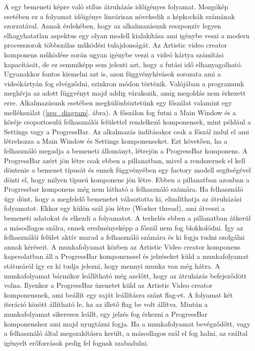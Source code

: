 \documentclass[12pt, a4paper, oneside]{book}
\theoremstyle{tetel}
\begin{document}
A egy bemeneti képre való stílus átruházás időigényes folyamat. Mozgókép esetében ez a folyamat időigénye lineárisan növekedik a képkockák számának szorzatával. Annak érdekében, hogy az alkalmazásunk reszponzív legyen elhagyhatatlan aspektus egy olyan modell kialakítása ami igénybe veszi a modern processzorok többszálas működési tulajdonságát. Az Artistic video creator komponens működése során ugyan igénybe veszi a videó kártya számítási kapacítását, de ez semmiképp sem jelenti azt, hogy a futási idő elhanyagolható. Ugyanakkor fontos kiemelni azt is, azon függvényhívások sorozata ami a videókártyán fog elvégződni, szinkron módon történik. Valójában a programunk meghívja az adott függvényt majd addig várakozik, amig megoldás nem érkezett erre.
\newline
\indent
Alkalmazásunk esetében megkülönböztetünk egy főszálat valamint egy mellékszálat (\ref{seq_diagram}. ábra). A főszálon fog futni a Main Window és a köréje csoportosulú felhasználói felülettel rendelkező komponensek, mint például a Settings vagy a ProgressBar. Az alkalmazás indításakor csak a főszál indul el ami létrehozza a Main Window és Settings komponenseket. Ezt követően, ha a felhasználó megadja a bemeneti állományt, létrejön a ProgressBar komponens. A ProgressBar azért jön létre csak ebben a pillanatban, mivel a rendszernek el kell döntenie a bemenet típusát és ennek függvényében egy factory modell segítségével dönti el, hogy milyen típusú komponens jön létre. Ebben a pillanatban azonban a Progressbar komponens még nem látható a felhasználó számára.
\newline
\indent
Ha felhasználó úgy dönt, hogy a megfelelő bemenetet választotta ki, elindíthatja az átruházási folyamatot. Ekkor egy külön szál jön létre (Worker thread), ami átveszi a bemeneti adatokat és elkezdi a folyamatot. A terhelés ebben a pillanatban átkerül a másodlagos szálra, ennek eredményeképp a főszál nem fog blokkolódni. Így az felhasználói felület aktív marad a felhasználó számára és ki fogja tudni szolgálni annak kéréseit.
A munkafolyamat közben az Artistic Video creator komponens kapcsolatban áll a ProgressBar komponenssel és jelzéseket küld a munkafolyamat státusáról így ez ki tudja jelezni, hogy mennyi munka van még hátra. A munkafolyamat bármikor leállítható még azelőtt, hogy az átruházás befejeződött volna. Ilyenkor a ProgressBar üzenetet küld az Artistic Video creator komponensnek, ami beállít egy saját leállításra szánt flag-et. A folyamat két iteráció között állítható le, ha az illető flag be volt állítva. Miután a munkafolyamat sikeresen leállt, egy jelzés fog érkezni a ProgressBar komponenshez ami majd nyugtázni fogja. Ha a munkafolyamat bevégződőtt, vagy a felhasználó által megszakításra került, a másodlagos szál el fog halni, az ezáltal igényelt erőforrások pedig fel fognak szabadulni.
\end{document}
